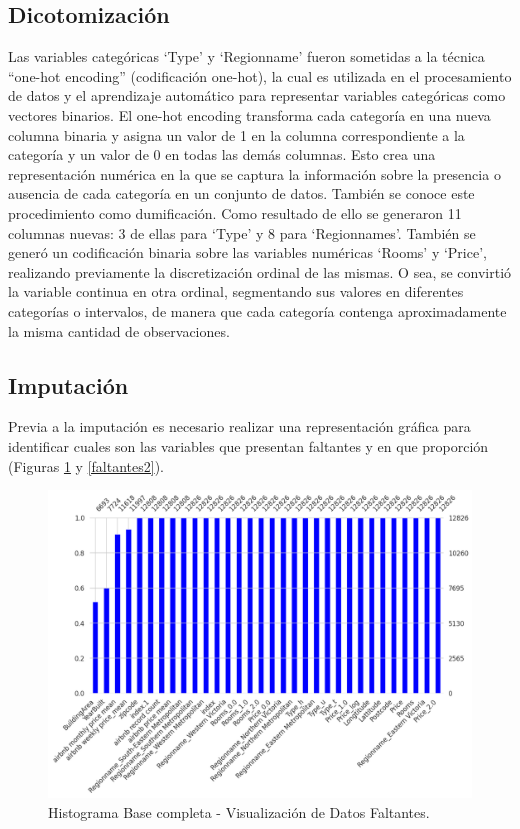 \subsection*{Dicotomización}
Las variables categóricas `Type' y `Regionname' fueron sometidas a la técnica ``one-hot encoding'' (codificación one-hot), la cual es utilizada en el procesamiento de datos y el aprendizaje automático para representar variables categóricas como vectores binarios. El one-hot encoding transforma cada categoría en una nueva columna binaria y asigna un valor de 1 en la columna correspondiente a la categoría y un valor de 0 en todas las demás columnas. Esto crea una representación numérica en la que se captura la información sobre la presencia o ausencia de cada categoría en un conjunto de datos. También se conoce este procedimiento como dumificación. Como resultado de ello se generaron 11 columnas nuevas: 3 de ellas para `Type' y 8 para `Regionnames'. 
También se generó un codificación binaria sobre las variables numéricas `Rooms' y `Price', realizando previamente la discretización ordinal de las mismas. O sea, se convirtió la variable continua en otra ordinal, segmentando sus valores en diferentes categorías o intervalos, de manera que cada categoría contenga aproximadamente la misma cantidad de observaciones.

\subsection*{Imputación}
Previa a la imputación es necesario realizar una representación gráfica para identificar cuales son las variables que presentan faltantes y en que proporción (Figuras \ref{faltantes} y \ref{faltantes2}).

\begin{figure} [!ht]
\begin{center}
\includegraphics[width=1.0\columnwidth]{img/datosfaltantes.png}
\caption{Histograma Base completa - Visualización de Datos Faltantes.}
\label{faltantes}
\end{center}
\end{figure}

